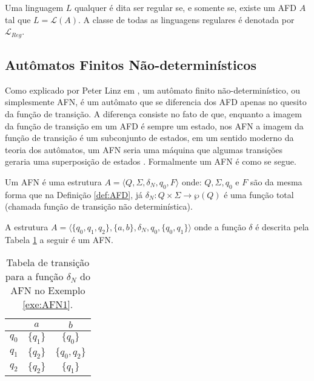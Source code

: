 \begin{definition}\label{def:LinguagensRegulares}
	Uma linguagem $L$ qualquer é dita ser regular se, e somente se, existe um AFD $A$ tal que $L = \mathcal{L}(A)$. A classe de todas as linguagens regulares é denotada por $\mathcal{L}_{Reg}$.
\end{definition}


\subsection{Autômatos Finitos Não-determinísticos}\label{subsec:AFN}

Como explicado por Peter Linz em \cite{linz2006}, um autômato finito não-determinístico, ou simplesmente AFN, é um autômato que se diferencia dos AFD apenas no quesito da função de transição. A diferença consiste no fato de que, enquanto a imagem da função de transição em um AFD é sempre um estado, nos AFN a imagem da  função de transição é um subconjunto de estados, em um sentido moderno da teoria dos autômatos, um AFN seria uma máquina que algumas transições geraria uma superposição de estados \cite{valdi2020phd}. Formalmente um AFN é como se segue.

\begin{definition}\label{def:AFN}
	Um AFN é uma estrutura $A = \langle Q, \Sigma, \delta_N, q_0, F\rangle$ onde: $Q, \Sigma, q_0$ e $F$ são da mesma forma que na Definição \ref{def:AFD}, já $\delta_N : Q \times \Sigma \rightarrow \wp(Q)$ é uma função total (chamada função de transição não determinística).
\end{definition}

\begin{exem}\label{exe:AFN1}
	A estrutura $A = \langle \{q_0, q_1, q_2\}, \{a, b\}, \delta_N, q_0, \{q_0, q_1\}  \rangle$ onde a função $\delta$ é descrita pela Tabela \ref{tab:DeltaAFN1} a seguir é um AFN.
	
	\begin{table}[h]
		\centering
		\begin{tabular}{c|cc}
			 \backslashbox{$Q$}{$\Sigma$}	& $a$ & $b$\\ \hline
			 $q_0$  & $\{q_1\}$ & $\{q_0\}$\\
			 $q_1$  & $\{q_2\}$ & $\{q_0, q_2\}$\\
			 $q_2$  & $\{q_2\}$ & $\{q_1\}$\\
		\end{tabular}
		\caption{Tabela de transição para a função $\delta_N$ do AFN no Exemplo \ref{exe:AFN1}.}
		\label{tab:DeltaAFN1}
	\end{table}
\end{exem}

